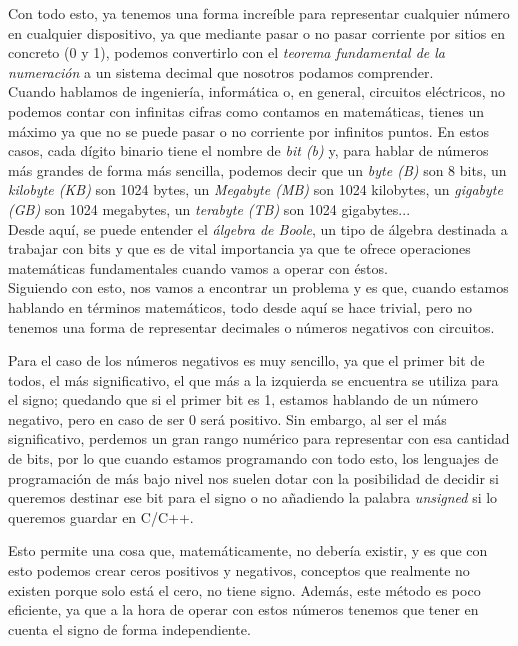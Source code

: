 \documentclass[12pt]{article}
\begin{document}
Con todo esto, ya tenemos una forma increíble para representar cualquier número en cualquier dispositivo, ya que mediante pasar o no pasar corriente por sitios en concreto (0 y 1), podemos convertirlo con el \emph{teorema fundamental de la numeración} a un sistema decimal que nosotros podamos comprender.
\\

Cuando hablamos de ingeniería, informática o, en general, circuitos eléctricos, no podemos contar con infinitas cifras como contamos en matemáticas, tienes un máximo ya que no se puede pasar o no corriente por infinitos puntos. En estos casos, cada dígito binario tiene el nombre de \emph{bit (b)} y, para hablar de números más grandes de forma más sencilla, podemos decir que un \emph{byte (B)} son 8 bits, un \emph{kilobyte (KB)} son 1024 bytes, un \emph{Megabyte (MB)} son 1024 kilobytes, un \emph{gigabyte (GB)} son 1024 megabytes, un \emph{terabyte (TB)} son 1024 gigabytes...
\\

Desde aquí, se puede entender el \emph{álgebra de Boole}, un tipo de álgebra destinada a trabajar con bits y que es de vital importancia ya que te ofrece operaciones matemáticas fundamentales cuando vamos a operar con éstos.
\\

Siguiendo con esto, nos vamos a encontrar un problema y es que, cuando estamos hablando en términos matemáticos, todo desde aquí se hace trivial, pero no tenemos una forma de representar decimales o números negativos con circuitos.

Para el caso de los números negativos es muy sencillo, ya que el primer bit de todos, el más significativo, el que más a la izquierda se encuentra se utiliza para el signo; quedando que si el primer bit es 1, estamos hablando de un número negativo, pero en caso de ser 0 será positivo. Sin embargo, al ser el más significativo, perdemos un gran rango numérico para representar con esa cantidad de bits, por lo que cuando estamos programando con todo esto, los lenguajes de programación de más bajo nivel nos suelen dotar con la posibilidad de decidir si queremos destinar ese bit para el signo o no añadiendo la palabra \emph{unsigned} si lo queremos guardar en C/C++.

Esto permite una cosa que, matemáticamente, no debería existir, y es que con esto podemos crear ceros positivos y negativos, conceptos que realmente no existen porque solo está el cero, no tiene signo. Además, este método es poco eficiente, ya que a la hora de operar con estos números tenemos que tener en cuenta el signo de forma independiente.
\end{document}
